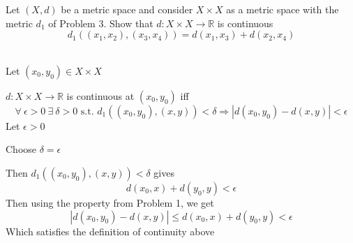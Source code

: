 \documentclass{article}
\begin{document}
\begin{problem}
Let \( (X,d) \) be a metric space and consider \( X \times X \) as a metric space with the metric \( d_1 \) of Problem 3. Show that \( d: X \times X \to \mathbb{R}\) is continuous
\[
	d_1((x_1,x_2), (x_3,x_4)) = d(x_1,x_{3}) + d(x_{2},x_{4})
\]
\\

\begin{solution}
	Let \( (x_{0},y_{0}) \in X \times X \)

	\( d: X \times X \to \mathbb{R} \) is continuous at \( (x_{0}, y_{0}) \) iff
	\[
		\forall \ \epsilon > 0 \ \exists \ \delta > 0 \text{ s.t. } d_{1}((x_{0},y_0), (x,y)) < \delta \Rightarrow |d(x_{0},y_{0}) - d(x,y)| < \epsilon
	\]
	Let \( \epsilon > 0 \)

	Choose \( \delta = \epsilon \)

	Then \( d_1((x_{0},y_{0}), (x,y)) < \delta \) gives
	\[
		d(x_{0},x) + d(y_{0},y) < \epsilon
	\]
	Then using the property from Problem 1, we get
	\[
		|d(x_{0},y_{0}) - d(x,y)| \le d(x_{0},x) + d(y_{0},y) < \epsilon
	\]
	Which satisfies the definition of continuity above
\end{solution}
\end{problem}
\end{document}
